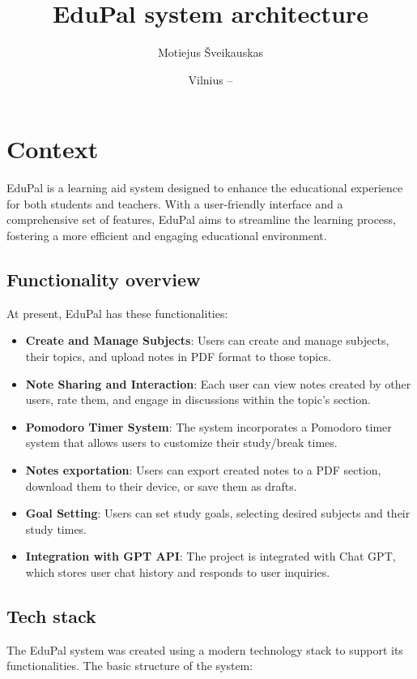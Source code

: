 \documentclass[
    english, %
]{VUMIFPSkursinis}
\title{EduPal system architecture}
\author{Motiejus Šveikauskas}
\date{Vilnius – \the\year}
\begin{document}
\maketitle

\tableofcontents

\section{Context}
EduPal is a learning aid system designed to enhance
the educational experience for both students and teachers. With a user-friendly interface and a comprehensive set of features, EduPal aims to streamline the learning process, fostering a more efficient and engaging educational environment.

\subsection{Functionality overview}

At present, EduPal has these functionalities:

\begin{itemize}
    \item \textbf{Create and Manage Subjects}: Users can create and manage subjects, their topics, and upload notes in PDF format to those topics.
    \item \textbf{Note Sharing and Interaction}: Each user can view notes created by other users, rate them, and engage in discussions within the topic's section.
    \item \textbf{Pomodoro Timer System}: The system incorporates a Pomodoro timer system that allows users to customize their study/break times.
    \item \textbf{Notes exportation}: Users can export created notes to a PDF section, download them to their device, or save them as drafts.
    \item \textbf{Goal Setting}: Users can set study goals, selecting desired subjects and their study times.
    \item \textbf{Integration with GPT API}: The project is integrated with Chat GPT, which stores user chat history and responds to user inquiries.
\end{itemize}

\subsection{Tech stack}

The EduPal system was created using a modern technology stack to support its functionalities. The basic structure of the system:
\end{document}
